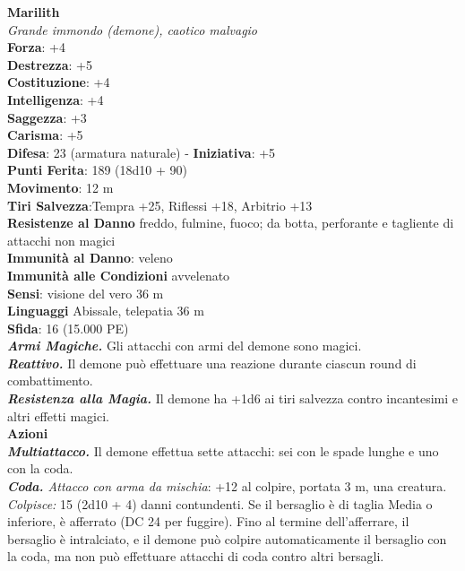 \begin{multicols}{2}
\medskip\textbf{Marilith}\\
\emph{Grande immondo (demone), caotico malvagio}\\
\textbf{Forza}: +4\\
\textbf{Destrezza}: +5\\
\textbf{Costituzione}: +4\\
\textbf{Intelligenza}: +4\\
\textbf{Saggezza}: +3\\
\textbf{Carisma}: +5\\
\textbf{Difesa}: 23 (armatura naturale) - \textbf{Iniziativa}: +5\\
\textbf{Punti Ferita}: 189 (18d10 + 90)\\
\textbf{Movimento}: 12 m\\
\textbf{Tiri Salvezza}:Tempra +25, Riflessi +18, Arbitrio +13\\
\textbf{Resistenze al Danno} freddo, fulmine, fuoco; da botta, perforante e tagliente di attacchi non magici\\
\textbf{Immunità al Danno}: veleno\\
\textbf{Immunità alle Condizioni} avvelenato\\
\textbf{Sensi}: visione del vero 36 m\\
\textbf{Linguaggi} Abissale, telepatia 36 m\\
\textbf{Sfida}: 16 (15.000 PE)\smallskip\\
\emph{\textbf{Armi Magiche.}} Gli attacchi con armi del demone sono magici.\\
\emph{\textbf{Reattivo.}} Il demone può effettuare una reazione durante ciascun round di combattimento.\\
\emph{\textbf{Resistenza alla Magia.}} Il demone ha +1d6 ai tiri salvezza contro incantesimi e altri effetti magici.\\
\smallskip\textbf{Azioni}\\
\emph{\textbf{Multiattacco.}} Il demone effettua sette attacchi: sei con le spade lunghe e uno con la coda.\\
\emph{\textbf{Coda.} Attacco con arma da mischia}: +12 al colpire, portata 3 m, una creatura.\\
\emph{Colpisce:} 15 (2d10 + 4) danni contundenti. Se il bersaglio è di taglia Media o inferiore, è afferrato (DC  24 per fuggire). Fino al termine dell'afferrare, il bersaglio è intralciato, e il demone può colpire automaticamente il bersaglio con la coda, ma non può effettuare attacchi di coda contro altri bersagli.\\

\end{multicols}
